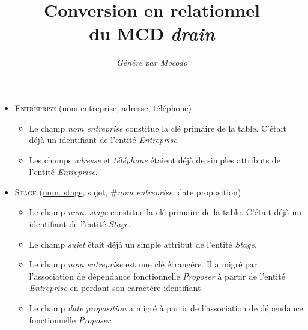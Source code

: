 \documentclass[a4paper]{article}
\title{Conversion en relationnel\\du MCD \emph{drain}}
\author{\emph{Généré par Mocodo}}
\newcommand{\relat}[1]{\textsc{#1}}
\newcommand{\attr}[1]{#1}
\newcommand{\prim}[1]{\uline{#1}}
\newcommand{\foreign}[1]{\#\textsl{#1}}
\begin{document}
\maketitle

\begin{itemize}
  \item \relat{Entreprise} (\prim{nom entreprise}, \attr{adresse}, \attr{téléphone})
  \begin{itemize}
    \item Le champ \emph{nom entreprise} constitue la clé primaire de la table. C'était déjà un identifiant de l'entité \emph{Entreprise}.
    \item Les champs \emph{adresse} et \emph{téléphone} étaient déjà de simples attributs de l'entité \emph{Entreprise}.
  \end{itemize}

  \item \relat{Stage} (\prim{num. stage}, \attr{sujet}, \foreign{nom entreprise}, \attr{date proposition})
  \begin{itemize}
    \item Le champ \emph{num. stage} constitue la clé primaire de la table. C'était déjà un identifiant de l'entité \emph{Stage}.
    \item Le champ \emph{sujet} était déjà un simple attribut de l'entité \emph{Stage}.
    \item Le champ \emph{nom entreprise} est une clé étrangère. Il a migré par l'association de dépendance fonctionnelle \emph{Proposer} à partir de l'entité \emph{Entreprise} en perdant son caractère identifiant.
    \item Le champ \emph{date proposition} a migré à partir de l'association de dépendance fonctionnelle \emph{Proposer}.
  \end{itemize}


\end{itemize}
\end{document}
